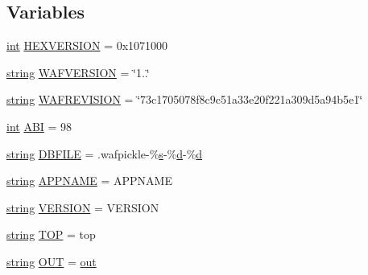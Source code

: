 \subsection*{Variables}
\begin{DoxyCompactItemize}
\item 
\hyperlink{xmltok_8h_a5a0d4a5641ce434f1d23533f2b2e6653}{int} \hyperlink{namespacewaflib_1_1_context_a26b498d8a1b686a1226796827d620ed8}{H\+E\+X\+V\+E\+R\+S\+I\+ON} = 0x1071000
\item 
\hyperlink{test__lib_f_l_a_c_2format_8c_ab02026ad0de9fb6c1b4233deb0a00c75}{string} \hyperlink{namespacewaflib_1_1_context_a5665a27322d480799baf9b22ebcb68c8}{W\+A\+F\+V\+E\+R\+S\+I\+ON} = \char`\"{}1..\char`\"{}
\item 
\hyperlink{test__lib_f_l_a_c_2format_8c_ab02026ad0de9fb6c1b4233deb0a00c75}{string} \hyperlink{namespacewaflib_1_1_context_a81bc2e1e3be69bd0b93e595c6845efc4}{W\+A\+F\+R\+E\+V\+I\+S\+I\+ON} = \char`\"{}73c1705078f8c9c51a33e20f221a309d5a94b5e1\char`\"{}
\item 
\hyperlink{xmltok_8h_a5a0d4a5641ce434f1d23533f2b2e6653}{int} \hyperlink{namespacewaflib_1_1_context_a5408b9a32f390889297246f0f080f0f3}{A\+BI} = 98
\item 
\hyperlink{test__lib_f_l_a_c_2format_8c_ab02026ad0de9fb6c1b4233deb0a00c75}{string} \hyperlink{namespacewaflib_1_1_context_ad004a46a5d5b3601921a121190d42551}{D\+B\+F\+I\+LE} = \textquotesingle{}.wafpickle-\/\%\hyperlink{lib_2expat_8h_a755339d27872b13735c2cab829e47157}{s}-\/\%\hyperlink{poly-fir_8h_a2530554172d8629149ec56816eeaa947}{d}-\/\%\hyperlink{poly-fir_8h_a2530554172d8629149ec56816eeaa947}{d}\textquotesingle{}
\item 
\hyperlink{test__lib_f_l_a_c_2format_8c_ab02026ad0de9fb6c1b4233deb0a00c75}{string} \hyperlink{namespacewaflib_1_1_context_a0c555585e79349fe4379b47bbd55b7c6}{A\+P\+P\+N\+A\+ME} = \textquotesingle{}A\+P\+P\+N\+A\+ME\textquotesingle{}
\item 
\hyperlink{test__lib_f_l_a_c_2format_8c_ab02026ad0de9fb6c1b4233deb0a00c75}{string} \hyperlink{namespacewaflib_1_1_context_a85bd1688f8aed8220d72caa9d0b9c25a}{V\+E\+R\+S\+I\+ON} = \textquotesingle{}V\+E\+R\+S\+I\+ON\textquotesingle{}
\item 
\hyperlink{test__lib_f_l_a_c_2format_8c_ab02026ad0de9fb6c1b4233deb0a00c75}{string} \hyperlink{namespacewaflib_1_1_context_acb6a3dbc6584d2592da0a9ec7a1283ff}{T\+OP} = \textquotesingle{}top\textquotesingle{}
\item 
\hyperlink{test__lib_f_l_a_c_2format_8c_ab02026ad0de9fb6c1b4233deb0a00c75}{string} \hyperlink{namespacewaflib_1_1_context_aad61d0808cafcbde47b419c710605574}{O\+UT} = \textquotesingle{}\hyperlink{latency_8c_a71fd1c281affec034757279e4f91c50b}{out}\textquotesingle{}

\end{DoxyCompactItemize}
